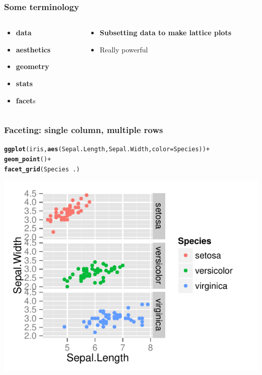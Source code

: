 \documentclass{beamer}\usepackage[]{graphicx}\usepackage[]{color}
\makeatletter
\newcommand{\hlopt}[1]{\textcolor[rgb]{0,0,0}{#1}}%
\newcommand{\hlstd}[1]{\textcolor[rgb]{0.345,0.345,0.345}{#1}}%
\newcommand{\hlkwc}[1]{\textcolor[rgb]{0.333,0.667,0.333}{#1}}%
\newcommand{\hlkwd}[1]{\textcolor[rgb]{0.737,0.353,0.396}{\textbf{#1}}}%
\newenvironment{kframe}{%
 \def\at@end@of@kframe{}%
 \ifinner\ifhmode%
  \def\at@end@of@kframe{\end{minipage}}%
  \begin{minipage}{\columnwidth}%
 \fi\fi%
 \def\FrameCommand##1{\hskip\@totalleftmargin \hskip-\fboxsep
 \colorbox{shadecolor}{##1}\hskip-\fboxsep
     \hskip-\linewidth \hskip-\@totalleftmargin \hskip\columnwidth}%
 \MakeFramed {\advance\hsize-\width
   \@totalleftmargin\z@ \linewidth\hsize
   \@setminipage}}%
 {\par\unskip\endMakeFramed%
 \at@end@of@kframe}
\newenvironment{knitrout}{}{} %
\makeatother
\begin{document}
\begin{frame}[fragile]
\frametitle{Some terminology}
\begin{columns}[t]

\begin{column}[T]{3cm}
\begin{itemize}
    \item \textbf{\color{gray}data}
    \item \textbf{\color{gray}aesthetics}
    \item \textbf{\color{gray}geometry}
    \item \textbf{\color{gray}stats}
    \item \textbf{facet}s
\end{itemize}
\end{column}

\begin{column}[T]{8cm}
\begin{itemize}
    \item \textbf{Subsetting data to make lattice plots}
    \item Really powerful
\end{itemize}
\end{column}

\end{columns}
\end{frame}


\begin{frame}[fragile]
\frametitle{Faceting: single column, multiple rows}
\begin{knitrout}\footnotesize
{}\color{fgcolor}\begin{kframe}
\begin{alltt}
\hlkwd{ggplot}\hlstd{(iris,} \hlkwd{aes}\hlstd{(Sepal.Length, Sepal.Width,} \hlkwc{color} \hlstd{= Species))} \hlopt{+}
\hlkwd{geom_point}\hlstd{()} \hlopt{+}
\hlkwd{facet_grid}\hlstd{(Species} \hlopt{~} \hlstd{.)}
\end{alltt}
\end{kframe}

{\centering \includegraphics[width=.75\linewidth]{figure/facetgrid1} 

}



\end{knitrout}

\end{frame}
\end{document}
